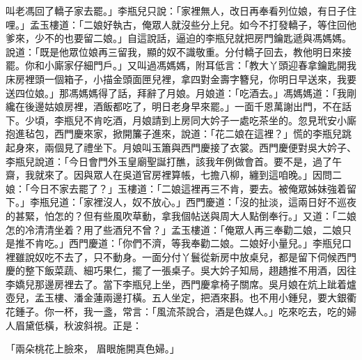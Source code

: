 叫老馮回了轎子家去罷。」李瓶兒只說：「家裡無人，改日再奉看列位娘，有日子住哩。」孟玉樓道：「二娘好執古，俺眾人就沒些分上兒。如今不打發轎子，等住回他爹來，少不的也要留二娘。」自這說話，逼迫的李瓶兒就把房門鑰匙遞與馮媽媽。說道：「既是他眾位娘再三留我，顯的奴不識敬重。分付轎子回去，教他明日來接罷。你和小廝家仔細門戶。」又叫過馮媽媽，附耳低言：「教大丫頭迎春拿鑰匙開我床房裡頭一個箱子，小描金頭面匣兒裡，拿四對金壽字簪兒，你明日早送來，我要送四位娘。」那馮媽媽得了話，拜辭了月娘。月娘道：「吃酒去。」馮媽媽道：「我剛纔在後邊姑娘房裡，酒飯都吃了，明日老身早來罷。」一面千恩萬謝出門，不在話下。少頃，李瓶兒不肯吃酒，月娘請到上房同大妗子一處吃茶坐的。忽見玳安小廝抱進毡包，西門慶來家，掀開簾子進來，說道：「花二娘在這裡？」慌的李瓶兒跳起身來，兩個見了禮坐下。月娘叫玉簫與西門慶接了衣裳。西門慶便對吳大妗子、李瓶兒說道：「今日會門外玉皇廟聖誕打醮，該我年例做會首。要不是，過了午齋，我就來了。因與眾人在吳道官房裡算帳，七擔八柳，纏到這咱晚。」因問二娘：「今日不家去罷了？」玉樓道：「二娘這裡再三不肯，要去。被俺眾姊妹強着留下。」李瓶兒道：「家裡沒人，奴不放心。」西門慶道：「沒的扯淡，這兩日好不巡夜的甚緊，怕怎的？但有些風吹草動，拿我個帖送與周大人點倒奉行。」又道：「二娘怎的冷清清坐着？用了些酒兒不曾？」孟玉樓道：「俺眾人再三奉勸二娘，二娘只是推不肯吃。」西門慶道：「你們不濟，等我奉勸二娘。二娘好小量兒。」李瓶兒口裡雖說奴吃不去了，只不動身。一面分付丫鬟從新房中放桌兒，都是留下伺候西門慶的整下飯菜蔬、細巧果仁，擺了一張桌子。吳大妗子知局，趐趫推不用酒，因往李嬌兒那邊房裡去了。當下李瓶兒上坐，西門慶拿椅子關席。吳月娘在炕上跐着爐壺兒，孟玉樓、潘金蓮兩邊打橫。五人坐定，把酒來斟。也不用小鍾兒，要大銀衢花鍾子。你一杯，我一盞，常言：「風流茶說合，酒是色媒人。」吃來吃去，吃的婦人眉黛低橫，秋波斜視。正是：

「兩朵桃花上臉來，  眉眼施開真色婦。」

